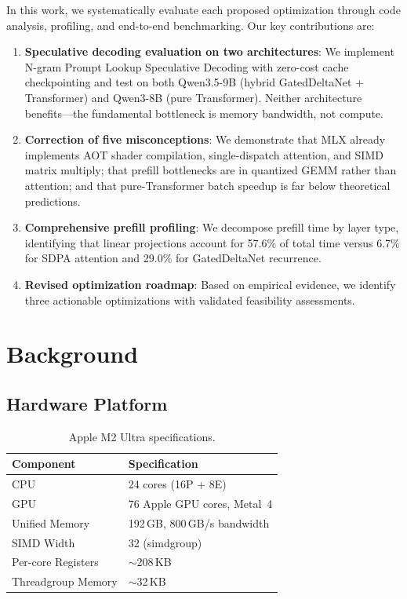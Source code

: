 \documentclass[11pt,a4paper]{article}
\begin{document}
In this work, we systematically evaluate each proposed optimization through code analysis, profiling, and end-to-end benchmarking. Our key contributions are:

\begin{enumerate}[leftmargin=2em]
  \item \textbf{Speculative decoding evaluation on two architectures}: We implement N-gram Prompt Lookup Speculative Decoding with zero-cost cache checkpointing and test on both Qwen3.5-9B (hybrid GatedDeltaNet + Transformer) and Qwen3-8B (pure Transformer). Neither architecture benefits---the fundamental bottleneck is memory bandwidth, not compute.

  \item \textbf{Correction of five misconceptions}: We demonstrate that MLX already implements AOT shader compilation, single-dispatch attention, and SIMD matrix multiply; that prefill bottlenecks are in quantized GEMM rather than attention; and that pure-Transformer batch speedup is far below theoretical predictions.

  \item \textbf{Comprehensive prefill profiling}: We decompose prefill time by layer type, identifying that linear projections account for 57.6\% of total time versus 6.7\% for SDPA attention and 29.0\% for GatedDeltaNet recurrence.

  \item \textbf{Revised optimization roadmap}: Based on empirical evidence, we identify three actionable optimizations with validated feasibility assessments.
\end{enumerate}

\section{Background}

\subsection{Hardware Platform}

\begin{table}[H]
\centering
\caption{Apple M2 Ultra specifications.}
\label{tab:hardware}
\begin{tabular}{ll}
\toprule
\textbf{Component} & \textbf{Specification} \\
\midrule
CPU & 24 cores (16P + 8E) \\
GPU & 76 Apple GPU cores, Metal~4 \\
Unified Memory & 192\,GB, 800\,GB/s bandwidth \\
SIMD Width & 32 (simdgroup) \\
Per-core Registers & $\sim$208\,KB \\
Threadgroup Memory & $\sim$32\,KB \\
\bottomrule
\end{tabular}
\end{table}
\end{document}
